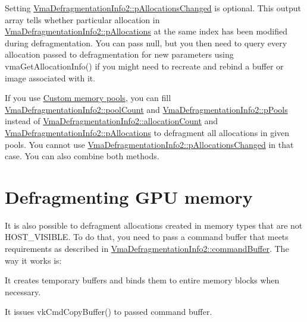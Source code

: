 Setting \hyperlink{structVmaDefragmentationInfo2_a76d51a644dc7f5405d0cdd0025ecd0cc}{Vma\+Defragmentation\+Info2\+::p\+Allocations\+Changed} is optional. This output array tells whether particular allocation in \hyperlink{structVmaDefragmentationInfo2_a8943f8d65969ce8e2189a1cdf3205e96}{Vma\+Defragmentation\+Info2\+::p\+Allocations} at the same index has been modified during defragmentation. You can pass null, but you then need to query every allocation passed to defragmentation for new parameters using vma\+Get\+Allocation\+Info() if you might need to recreate and rebind a buffer or image associated with it.

If you use \hyperlink{choosing_memory_type_choosing_memory_type_custom_memory_pools}{Custom memory pools}, you can fill \hyperlink{structVmaDefragmentationInfo2_a7e70aa2a1081d849dcc7829b19d3ec9d}{Vma\+Defragmentation\+Info2\+::pool\+Count} and \hyperlink{structVmaDefragmentationInfo2_a0b3effd57f3fcdeb2ed62210b4ef20e1}{Vma\+Defragmentation\+Info2\+::p\+Pools} instead of \hyperlink{structVmaDefragmentationInfo2_a3cf86ab32c1da779b4923d301a3056ba}{Vma\+Defragmentation\+Info2\+::allocation\+Count} and \hyperlink{structVmaDefragmentationInfo2_a8943f8d65969ce8e2189a1cdf3205e96}{Vma\+Defragmentation\+Info2\+::p\+Allocations} to defragment all allocations in given pools. You cannot use \hyperlink{structVmaDefragmentationInfo2_a76d51a644dc7f5405d0cdd0025ecd0cc}{Vma\+Defragmentation\+Info2\+::p\+Allocations\+Changed} in that case. You can also combine both methods.\hypertarget{defragmentation_defragmentation_gpu}{}\section{Defragmenting G\+P\+U memory}\label{defragmentation_defragmentation_gpu}
It is also possible to defragment allocations created in memory types that are not {\ttfamily H\+O\+S\+T\+\_\+\+V\+I\+S\+I\+B\+LE}. To do that, you need to pass a command buffer that meets requirements as described in \hyperlink{structVmaDefragmentationInfo2_a7f71f39590c5316771493d2333f9c1bd}{Vma\+Defragmentation\+Info2\+::command\+Buffer}. The way it works is\+:


\begin{DoxyItemize}
\item It creates temporary buffers and binds them to entire memory blocks when necessary.
\item It issues {\ttfamily vk\+Cmd\+Copy\+Buffer()} to passed command buffer.
\end{DoxyItemize}

